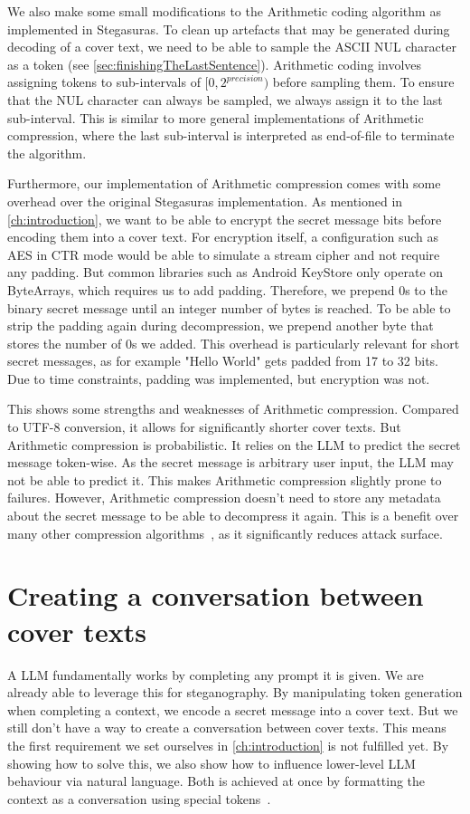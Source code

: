 We also make some small modifications to the Arithmetic coding algorithm as implemented in Stegasuras. To clean up artefacts that may be generated during decoding of a cover text, we need to be able to sample the ASCII NUL character as a token (see \cref{sec:finishingTheLastSentence}). Arithmetic coding involves assigning tokens to sub-intervals of $ [0, 2^{precision}) $ before sampling them. To ensure that the NUL character can always be sampled, we always assign it to the last sub-interval. This is similar to more general implementations of Arithmetic compression, where the last sub-interval is interpreted as end-of-file to terminate the algorithm.

Furthermore, our implementation of Arithmetic compression comes with some overhead over the original Stegasuras implementation. As mentioned in \cref{ch:introduction}, we want to be able to encrypt the secret message bits before encoding them into a cover text. For encryption itself, a configuration such as \gls{AES} in \gls{CTR} mode would be able to simulate a stream cipher and not require any padding. But common libraries such as Android KeyStore only operate on ByteArrays, which requires us to add padding. Therefore, we prepend 0s to the binary secret message until an integer number of bytes is reached. To be able to strip the padding again during decompression, we prepend another byte that stores the number of 0s we added. This overhead is particularly relevant for short secret messages, as for example "Hello World" gets padded from 17 to 32 bits. Due to time constraints, padding was implemented, but encryption was not.

This shows some strengths and weaknesses of Arithmetic compression. Compared to UTF-8 conversion, it allows for significantly shorter cover texts. But Arithmetic compression is probabilistic. It relies on the \gls{LLM} to predict the secret message token-wise. As the secret message is arbitrary user input, the \gls{LLM} may not be able to predict it. This makes Arithmetic compression slightly prone to failures. However, Arithmetic compression doesn't need to store any metadata about the secret message to be able to decompress it again. This is a benefit over many other compression algorithms~\cite{huffmanMethodConstructionMinimumRedundancy1952}, as it significantly reduces attack surface.

\section{Creating a conversation between cover texts}
\label{sec:creatingAConversationBetweenCoverTexts}
A \gls{LLM} fundamentally works by completing any prompt it is given. We are already able to leverage this for steganography. By manipulating token generation when completing a context, we encode a secret message into a cover text. But we still don't have a way to create a conversation between cover texts. This means the first requirement we set ourselves in \cref{ch:introduction} is not fulfilled yet. By showing how to solve this, we also show how to influence lower-level \gls{LLM} behaviour via natural language. Both is achieved at once by formatting the context as a conversation using special tokens~\cite{jiangChatBugCommonVulnerability2025}.

